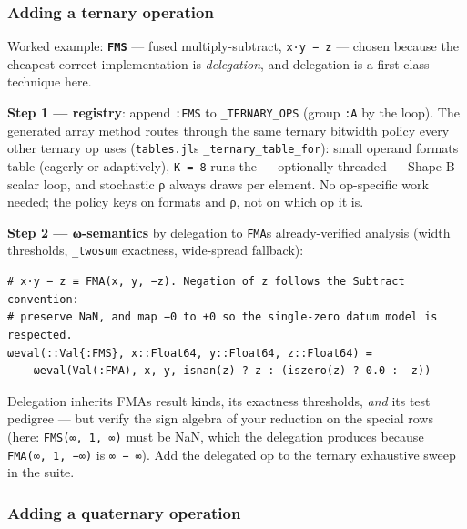 \subsubsection{Adding a ternary operation}



\label{10687193682775408327}{}


Worked example: \textbf{\texttt{FMS}} — fused multiply-subtract, \texttt{x·y − z} — chosen because the cheapest correct implementation is \emph{delegation}, and delegation is a first-class technique here.



\textbf{Step 1 — registry}: append \texttt{:FMS} to \texttt{\_\allowbreak{}TERNARY\_\allowbreak{}OPS} (group \texttt{:A} by the loop). The generated array method routes through the same ternary bitwidth policy every other ternary op uses (\texttt{tables.jl}{\textquotesingle}s \texttt{\_\allowbreak{}ternary\_\allowbreak{}table\_\allowbreak{}for}): small operand formats table (eagerly or adaptively), \texttt{K = 8} runs the — optionally threaded — Shape-B scalar loop, and stochastic ρ always draws per element. No op-specific work needed; the policy keys on formats and ρ, not on which op it is.



\textbf{Step 2 — ω-semantics} by delegation to \texttt{FMA}{\textquotesingle}s already-verified analysis (width thresholds, \texttt{\_\allowbreak{}twosum} exactness, wide-spread fallback):




\nopagebreak[4]
\begin{verbatim}
# x·y − z ≡ FMA(x, y, −z). Negation of z follows the Subtract convention:
# preserve NaN, and map −0 to +0 so the single-zero datum model is respected.
ωeval(::Val{:FMS}, x::Float64, y::Float64, z::Float64) =
    ωeval(Val(:FMA), x, y, isnan(z) ? z : (iszero(z) ? 0.0 : -z))
\end{verbatim}



Delegation inherits FMA{\textquotesingle}s result kinds, its exactness thresholds, \emph{and} its test pedigree — but verify the sign algebra of your reduction on the special rows (here: \texttt{FMS(∞, 1, ∞)} must be NaN, which the delegation produces because \texttt{FMA(∞, 1, −∞)} is \texttt{∞ − ∞}). Add the delegated op to the ternary exhaustive sweep in the suite.



\subsubsection{Adding a quaternary operation}



